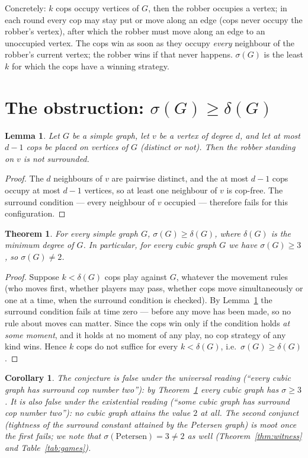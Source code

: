 \documentclass[11pt]{article}
\newtheorem{theorem}{Theorem}
\newtheorem{corollary}{Corollary}
\newtheorem{lemma}{Lemma}
\begin{document}
Concretely: $k$ cops occupy vertices of $G$, then the robber occupies a vertex;
in each round every cop may stay put or move along an edge (cops never occupy
the robber's vertex), after which the robber must move along an edge to an
unoccupied vertex.  The cops win as soon as they occupy \emph{every} neighbour
of the robber's current vertex; the robber wins if that never happens.
$\sigma(G)$ is the least $k$ for which the cops have a winning strategy.

\section{The obstruction: $\sigma(G)\ge\delta(G)$}

\begin{lemma}\label{lem:mindeg}
Let $G$ be a simple graph, let $v$ be a vertex of degree $d$, and let at most
$d-1$ cops be placed on vertices of $G$ (distinct or not).  Then the robber
standing on $v$ is \emph{not} surrounded.
\end{lemma}

\begin{proof}
The $d$ neighbours of $v$ are pairwise distinct, and the at most $d-1$ cops
occupy at most $d-1$ vertices, so at least one neighbour of $v$ is cop-free.
The surround condition --- every neighbour of $v$ occupied --- therefore fails
for this configuration.
\end{proof}

\begin{theorem}\label{thm:main}
For every simple graph $G$, $\sigma(G)\ge\delta(G)$, where $\delta(G)$ is the
minimum degree of $G$.  In particular, for every cubic graph $G$ we have
$\sigma(G)\ge 3$, so $\sigma(G)\ne 2$.
\end{theorem}

\begin{proof}
Suppose $k<\delta(G)$ cops play against $G$, whatever the movement rules (who
moves first, whether players may pass, whether cops move simultaneously or one
at a time, when the surround condition is checked).  By
Lemma~\ref{lem:mindeg} the surround condition fails at time zero --- before
any move has been made, so no rule about moves can matter.  Since the cops win
only if the condition holds \emph{at some moment}, and it holds at no moment
of any play, no cop strategy of any kind wins.  Hence $k$ cops do not suffice
for every $k<\delta(G)$, i.e.\ $\sigma(G)\ge\delta(G)$.
\end{proof}

\begin{corollary}\label{cor:cubic}
The conjecture is false under the universal reading (``every cubic graph has
surround cop number two''): by Theorem~\ref{thm:main} \emph{every} cubic graph
has $\sigma\ge 3$.  It is also false under the existential reading (``some
cubic graph has surround cop number two''): no cubic graph attains the value
$2$ at all.  The second conjunct (tightness of the surround constant attained
by the Petersen graph) is moot once the first fails; we note that
$\sigma(\text{Petersen}) = 3\ne 2$ as well (Theorem~\ref{thm:witness} and
Table~\ref{tab:games}).
\end{corollary}
\end{document}
